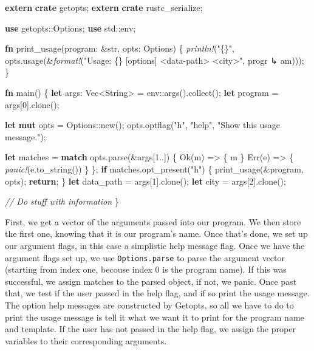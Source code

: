 \documentclass[a4paper,]{book}
\newenvironment{Shaded}{\begin{snugshade}}{\end{snugshade}}
\newcommand{\KeywordTok}[1]{\textcolor[rgb]{0.13,0.29,0.53}{\textbf{{#1}}}}
\newcommand{\DataTypeTok}[1]{\textcolor[rgb]{0.13,0.29,0.53}{{#1}}}
\newcommand{\DecValTok}[1]{\textcolor[rgb]{0.00,0.00,0.81}{{#1}}}
\newcommand{\ConstantTok}[1]{\textcolor[rgb]{0.00,0.00,0.00}{{#1}}}
\newcommand{\StringTok}[1]{\textcolor[rgb]{0.31,0.60,0.02}{{#1}}}
\newcommand{\CommentTok}[1]{\textcolor[rgb]{0.56,0.35,0.01}{\textit{{#1}}}}
\newcommand{\PreprocessorTok}[1]{\textcolor[rgb]{0.56,0.35,0.01}{\textit{{#1}}}}
\newcommand{\NormalTok}[1]{{#1}}
\begin{document}
\begin{Shaded}
\begin{Highlighting}[]
\KeywordTok{extern} \KeywordTok{crate} \NormalTok{getopts;}
\KeywordTok{extern} \KeywordTok{crate} \NormalTok{rustc_serialize;}

\KeywordTok{use} \NormalTok{getopts::Options;}
\KeywordTok{use} \NormalTok{std::env;}

\KeywordTok{fn} \NormalTok{print_usage(program: &}\DataTypeTok{str}\NormalTok{, opts: Options) \{}
    \PreprocessorTok{println!}\NormalTok{(}\StringTok{"\{\}"}\NormalTok{, opts.usage(&}\PreprocessorTok{format!}\NormalTok{(}\StringTok{"Usage: \{\} [options] <data-path> <city>"}\NormalTok{, progr}
\NormalTok{↳ am)));}
\NormalTok{\}}

\KeywordTok{fn} \NormalTok{main() \{}
    \KeywordTok{let} \NormalTok{args: }\DataTypeTok{Vec}\NormalTok{<}\DataTypeTok{String}\NormalTok{> = env::args().collect();}
    \KeywordTok{let} \NormalTok{program = args[}\DecValTok{0}\NormalTok{].clone();}

    \KeywordTok{let} \KeywordTok{mut} \NormalTok{opts = Options::new();}
    \NormalTok{opts.optflag(}\StringTok{"h"}\NormalTok{, }\StringTok{"help"}\NormalTok{, }\StringTok{"Show this usage message."}\NormalTok{);}

    \KeywordTok{let} \NormalTok{matches = }\KeywordTok{match} \NormalTok{opts.parse(&args[}\DecValTok{1.}\NormalTok{.]) \{}
        \ConstantTok{Ok}\NormalTok{(m)  => \{ m \}}
    \ConstantTok{Err}\NormalTok{(e) => \{ }\PreprocessorTok{panic!}\NormalTok{(e.to_string()) \}}
    \NormalTok{\};}
    \KeywordTok{if} \NormalTok{matches.opt_present(}\StringTok{"h"}\NormalTok{) \{}
        \NormalTok{print_usage(&program, opts);}
    \KeywordTok{return}\NormalTok{;}
    \NormalTok{\}}
    \KeywordTok{let} \NormalTok{data_path = args[}\DecValTok{1}\NormalTok{].clone();}
    \KeywordTok{let} \NormalTok{city = args[}\DecValTok{2}\NormalTok{].clone();}

    \CommentTok{// Do stuff with information}
\NormalTok{\}}
\end{Highlighting}
\end{Shaded}

First, we get a vector of the arguments passed into our program. We then
store the first one, knowing that it is our program's name. Once that's
done, we set up our argument flags, in this case a simplistic help
message flag. Once we have the argument flags set up, we use
\texttt{Options.parse} to parse the argument vector (starting from index
one, becouse index 0 is the program name). If this was successful, we
assign matches to the parsed object, if not, we panic. Once past that,
we test if the user passed in the help flag, and if so print the usage
message. The option help messages are constructed by Getopts, so all we
have to do to print the usage message is tell it what we want it to
print for the program name and template. If the user has not passed in
the help flag, we assign the proper variables to their corresponding
arguments.
\end{document}
